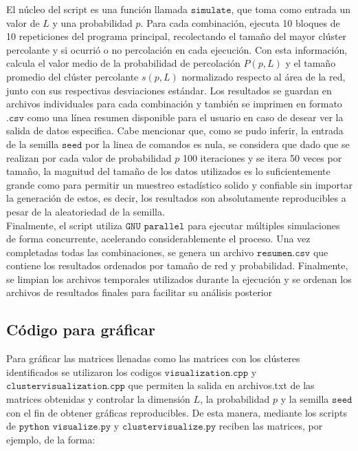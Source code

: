\documentclass[12pt,a4paper]{article}
\begin{document}
El núcleo del script es una función llamada $\texttt{simulate}$, que toma como entrada un valor de $L$ y una probabilidad $p$. Para cada combinación, ejecuta 10 bloques de 10 repeticiones del programa principal, recolectando el tamaño del mayor clúster percolante y si ocurrió o no percolación en cada ejecución. Con esta información, calcula el valor medio de la probabilidad de percolación $P(p,L)$ y el tamaño promedio del clúster percolante $s(p,L)$ normalizado respecto al área de la red, junto con sus respectivas desviaciones estándar. Los resultados se guardan en archivos individuales para cada combinación y también se imprimen en formato $\texttt{.csv}$ como una línea resumen disponible para el usuario en caso de desear ver la salida de datos especifica. Cabe mencionar que, como se pudo inferir, la entrada de la semilla $\texttt{seed}$ por la linea de comandos es nula, se considera que dado que se realizan por cada valor de probabilidad $p$ 100 iteraciones y se itera 50 veces por tamaño, la magnitud del tamaño de los datos utilizados es lo suficientemente grande como para permitir un muestreo estadístico solido y confiable sin importar la generación de estos, es decir, los resultados son absolutamente reproducibles a pesar de la aleatoriedad de la semilla.\\

Finalmente, el script utiliza $\texttt{GNU parallel}$ para ejecutar múltiples simulaciones de forma concurrente, acelerando considerablemente el proceso. Una vez completadas todas las combinaciones, se genera un archivo $\texttt{resumen.csv}$ que contiene los resultados ordenados por tamaño de red y probabilidad. Finalmente, se limpian los archivos temporales utilizados durante la ejecución y se ordenan los archivos de resultados finales para facilitar su análisis posterior

\subsection{Código para gráficar}
Para gráficar las matrices llenadas como las matrices con los clústeres identificados se utilizaron los codigos $\texttt{visualization.cpp}$ y $\texttt{clustervisualization.cpp}$ que permiten la salida en archivos.txt de las matrices obtenidas y controlar la dimensión $L$, la probabilidad $p$ y la semilla $\texttt{seed}$ con el fin de obtener gráficas reproducibles. De esta manera, mediante los scripts de $\texttt{python}$ $\texttt{visualize.py}$ y $\texttt{clustervisualize.py}$ reciben las matrices, por ejemplo, de la forma: 
\\
\end{document}
